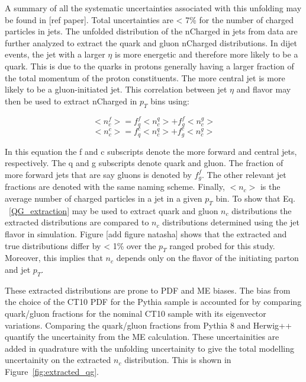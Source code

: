 A summary of all the systematic uncertainties associated with this unfolding may be found in [ref paper]. Total uncertainties are < 7\% for the number of charged particles in jets. The unfolded distribution of the nCharged in jets from data are further analyzed to extract the quark and gluon nCharged distributions. In dijet events, the jet with a larger $\eta$ is more energetic and therefore more likely to be a quark. This is due to the quarks in protons generally having a larger fraction of the total momentum of the proton constituents. The more central jet is more likely to be a gluon-initiated jet. This correlation between jet $\eta$ and flavor may then be used to extract nCharged in $p_{T}$ bins using:

\begin{equation}
<n_{c}^{f}> = f_{q}^{f}<n_{c}^{q}> + f^{f}_{g}<n_{c}^{g}>
\end{equation}
\begin{equation}
<n_{c}^{c}> = f_{q}^{c}<n_{c}^{q}> + f^{c}_{g}<n_{c}^{g}> 
\end{equation}


In this equation the f and c subscripts denote the more forward and central jets, respectively. The q and g subscripts denote quark and gluon. The fraction of more forward jets that are say gluons is denoted by $f_{g}^{f}$. The other relevant jet fractions are denoted with the same naming scheme. Finally, $<n_{c}>$ is the average number of charged particles in a jet in a given $p_{T}$ bin. To show that Eq. ~\eqref{QG_extraction} may be used to extract quark and gluon $n_{c}$ distributions the extracted distributions are compared to $n_{c}$ distributions determined using the jet flavor in simulation. Figure [add figure natasha] shows that the extracted and true distributions differ by < 1\% over the $p_{T}$ ranged probed for this study. Moreover, this implies that $n_{c}$ depends only on the flavor of the initiating parton and jet $p_{T}$. 

These extracted distributions are prone to PDF and ME biases. The bias from the choice of the CT10 PDF for the Pythia sample is accounted for by comparing quark/gluon fractions for the nominal CT10 sample with its eigenvector variations. Comparing the quark/gluon fractions from Pythia 8 and Herwig++ quantify the uncertainity from the ME calculation. These uncertainities are added in quadrature with the unfolding uncertainity to give the total modelling uncertainity on the extracted $n_{c}$ distribution. This is shown in Figure~\ref{fig:extracted_qg}.

